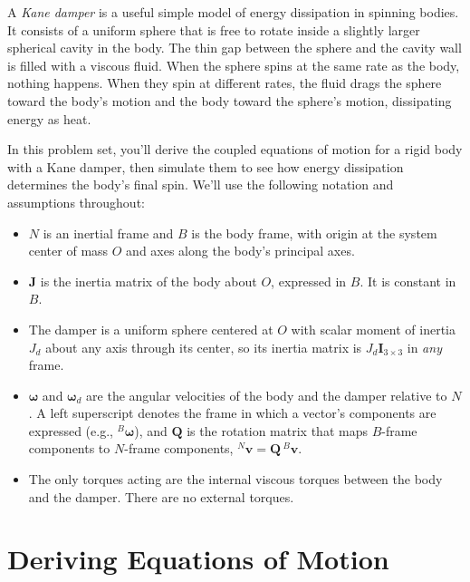\documentclass[11pt,letterpaper]{article}
\newcommand{\bw}{\boldsymbol{\omega}}
\newcommand{\bwd}{\boldsymbol{\omega}_d}
\newcommand{\Bw}{{}^{B}\boldsymbol{\omega}}
\newcommand{\bJ}{\mathbf{J}}
\newcommand{\bQ}{\mathbf{Q}}
\begin{document}
\noindent A \emph{Kane damper} is a useful simple model of energy dissipation in spinning bodies. It consists of a uniform sphere that is free to rotate inside a slightly larger spherical cavity in the body. The thin gap between the sphere and the cavity wall is filled with a viscous fluid. When the sphere spins at the same rate as the body, nothing happens. When they spin at different rates, the fluid drags the sphere toward the body's motion and the body toward the sphere's motion, dissipating energy as heat.

In this problem set, you'll derive the coupled equations of motion for a rigid body with a Kane damper, then simulate them to see how energy dissipation determines the body's final spin. We'll use the following notation and assumptions throughout:
\begin{itemize}
    \item $N$ is an inertial frame and $B$ is the body frame, with origin at the system center of mass $O$ and axes along the body's principal axes.
    \item $\bJ$ is the inertia matrix of the body about $O$, expressed in $B$. It is constant in $B$.
    \item The damper is a uniform sphere centered at $O$ with scalar moment of inertia $J_d$ about any axis through its center, so its inertia matrix is $J_d\mathbf{I}_{3\times3}$ in \emph{any} frame.
    \item $\bw$ and $\bwd$ are the angular velocities of the body and the damper relative to $N$. A left superscript denotes the frame in which a vector's components are expressed (e.g., $\Bw$), and $\bQ$ is the rotation matrix that maps $B$-frame components to $N$-frame components, ${}^{N}\mathbf{v} = \bQ\,{}^{B}\mathbf{v}$.
    \item The only torques acting are the internal viscous torques between the body and the damper. There are no external torques.
\end{itemize}

\section{Deriving Equations of Motion}
\end{document}
